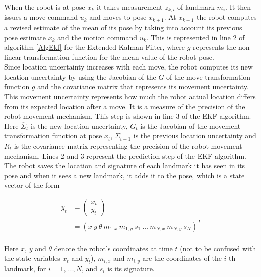 \documentclass[conference]{IEEEtran}
\begin{document}
When the robot is at pose $x_k$ it takes measurement $z_{k,i}$ of landmark $m_i$. It then issues a move command $u_k$ and moves to pose $x_{k+1}$. At $x_{k+1}$ the robot computes a revised estimate of the mean of its pose by taking into account its previous pose estimate $x_k$ and the motion command $u_k$. This is represented in line $2$ of algorithm \ref{AlgEkf} for the Extended Kalman Filter, where $g$ represents the non-linear transformation function for the mean value of the robot pose.\\

Since location uncertainty increases with each move, the robot computes its new location uncertainty by using the Jacobian of the $G$ of the move transformation function $g$ and the covariance matrix that represents its movement uncertainty. This movement uncertainty represents how much the robot actual location differs from its expected location after a move. It is a measure of the precision of the robot movement mechanism. This step is shown in line $3$ of the EKF algorithm. Here  $\overline \Sigma_t$ is the new location uncertainty, $G_t$ is the Jacobian of the movement transformation function at pose $x_t$, $\Sigma_{t-1}$ is the previous location uncertainty and $R_t$ is the covariance matrix representing the precision of the robot movement mechanism. Lines $2$ and $3$ represent the prediction step of the EKF algorithm.\\

The robot saves the location and signature of each landmark it has seen in its pose \cite{thrun} and when it sees a new landmark, it adds it to the pose, which is a state vector of the form

\begin{equation}\label{StateVector}
\begin{aligned}
y_t &= \begin{pmatrix}
		x_t\\
		y_t
	   \end{pmatrix}\\
& = (x~y~\theta~m_{1,x}~m_{1,y}~s_1~\ldots~m_{N,x}~m_{N,y}~s_N)^T\\
\end{aligned}
\end{equation}

Here $x$, $y$ and $\theta$ denote the robot's coordinates at time $t$ (not to be confused with the state variables $x_t$ and $y_t$), $m_{i,x}$ and $m_{i,y}$ are the coordinates of the $i$-th landmark, for $i=1,\dots,N$, and $s_i$ is its signature.\\
\end{document}

